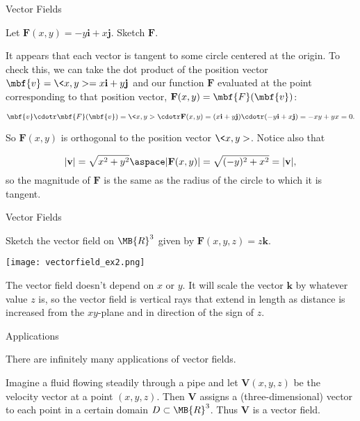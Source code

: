 \documentclass[11pt,english,
handout
]{beamer}
\begin{document}
\begin{frame}[t]{Vector Fields}
\small
\begin{example}
Let $\mathbf{F}(x,y)=-y\mathbf{i}+x\mathbf{j}$. Sketch $\mathbf{F}$.

\lspace
It appears that each vector is tangent to some circle centered at the origin. To check this, we can take the dot product of the position vector $\mbf{v}=\<x,y>=x\mathbf{i}+y\mathbf{j}$ and our function $\mathbf{F}$ evaluated at the point corresponding to that position vector, $\mathbf{F}(x,y)=\mbf{F}(\mbf{v})$:\pause 

\[
\mbf{v}\cdotr\mbf{F}(\mbf{v})=\<x,y>\cdotr\mathbf{F}(x,y)=(x\mathbf{i}+y\mathbf{j})\cdotr(-y\mathbf{i}+x\mathbf{j})=-xy+yx=0.
\]\pause 

So $\mathbf{F}(x,y)$ is orthogonal to the position vector $\<x,y>$. \pause Notice also that 

\[
|\mathbf{v}|=\sqrt{x^2+y^2}\aspace|\mathbf{F}(x,y)|=\sqrt{(-y)^2+x^2}=|\mathbf{v}|,
\]
so the magnitude of $\mathbf{F}$ is the same as the radius of the circle to which it is tangent.
\end{example}
\end{frame}












\begin{frame}[t]{Vector Fields}
\small
\begin{example}
Sketch the vector field on $\MB{R}^3$ given by $\mathbf{F}(x,y,z)=z\mathbf{k}$.\pause 


\begin{center}
\texttt{[image: vectorfield\_ex2.png]}
\end{center}

The vector field doesn't depend on $x$ or $y$. It will scale the vector $\mathbf{k}$ by whatever value $z$ is, so the vector field is vertical rays that extend in length as distance is increased from the $xy$-plane and in direction of the sign of $z$.
\end{example}
\end{frame}









\begin{frame}[t]{Applications}

There are infinitely many applications of vector fields.\pause 

\lspace
\begin{example}
Imagine a fluid flowing steadily through a pipe and let $\mathbf{V}(x,y,z)$ be the velocity vector at a point $(x,y,z)$. Then $\mathbf{V}$ assigns a (three-dimensional) vector to each point in a certain domain $D\subset\MB{R}^3$. Thus $\mathbf{V}$ is a vector field.
\end{example}
\end{frame}
\end{document}
